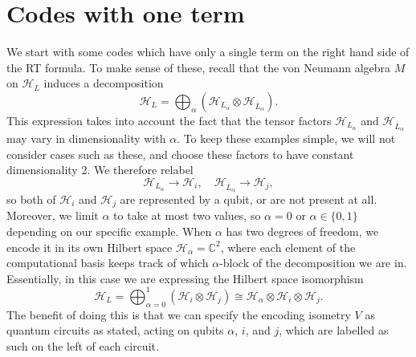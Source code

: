 \documentclass[12pt,a4paper]{report}
\numberwithin{equation}{section}
\newcommand{\ol}[1]{\overline{#1}}
\theoremstyle{definition}
\theoremstyle{theorem}
\theoremstyle{theorem}
\theoremstyle{example}
\theoremstyle{definition}
\begin{document}
\section{Codes with one term}
We start with some codes which have only a single term on the right hand side of the RT formula. To make sense of these, recall that the von Neumann algebra $M$ on $\mathcal{H}_{L}$ induces a decomposition
\begin{equation}
	\mathcal{H}_{L}=\bigoplus_{\alpha}\left(\mathcal{H}_{L_{\alpha}}\otimes\mathcal{H}_{\ol{L}_{\alpha}}\right).
\end{equation}
This expression takes into account the fact that the tensor factors $\mathcal{H}_{L_{\alpha}}$ and $\mathcal{H}_{\ol{L}_{\alpha}}$ may vary in dimensionality with $\alpha$. To keep these examples simple, we will not consider cases such as these, and choose these factors to have constant dimensionality 2. We therefore relabel
\begin{equation}
	\mathcal{H}_{L_{\alpha}}\to\mathcal{H}_{i},\quad\mathcal{H}_{\ol{L}_{\alpha}}\to\mathcal{H}_{j},
\end{equation}
so both of $\mathcal{H}_{i}$ and $\mathcal{H}_{j}$ are represented by a qubit, or are not present at all. Moreover, we limit $\alpha$ to take at most two values, so $\alpha=0$ or $\alpha\in\{0,1\}$ depending on our specific example. When $\alpha$ has two degrees of freedom, we encode it in its own Hilbert space $\mathcal{H}_{\alpha}=\mathbb{C}^{2}$, where each element of the computational basis keeps track of which $\alpha$-block of the decomposition we are in. Essentially, in this case we are expressing the Hilbert space isomorphism
\begin{equation}
	\mathcal{H}_{L}=\bigoplus_{\alpha=0}^{1}\left(\mathcal{H}_{i}\otimes\mathcal{H}_{j}\right)\cong \mathcal{H}_{\alpha}\otimes\mathcal{H}_{i}\otimes\mathcal{H}_{j}.
\end{equation}
The benefit of doing this is that we can specify the encoding isometry $V$ as quantum circuits as stated, acting on qubits $\alpha$, $i$, and $j$, which are labelled as such on the left of each circuit.
\end{document}
